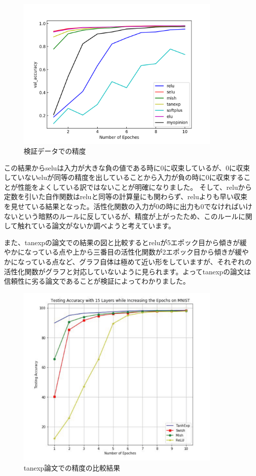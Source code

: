 \documentclass[12pt,a4j,draft]{jsarticle}
\begin{document}
\begin{figure}[H]
  \begin{center}
    \includegraphics[width=10.0cm]{../comparison_data/mnist_val_acc.png}
    \caption{検証データでの精度}
    \label{val_acc}
  \end{center}
\end{figure}

この結果からseluは入力が大きな負の値である時に0に収束しているが、0に収束していないeluが同等の精度を出していることから入力が負の時に0に収束することが性能をよくしている訳ではないことが明確になりました。
そして、reluから定数を引いた自作関数はreluと同等の計算量にも関わらず、reluよりも早い収束を見せている結果となった。活性化関数の入力が0の時に出力も0でなければいけないという暗黙のルールに反しているが、精度が上がったため、このルールに関して触れている論文がないか調べようと考えています。

また、tanexpの論文での結果の図と比較するとreluが5エポック目から傾きが緩やかになっている点や上から三番目の活性化関数が2エポック目から傾きが緩やかになっている点など、グラフ自体は極めて近い形をしていますが、それぞれの活性化関数がグラフと対応していないように見られます。よってtanexpの論文は信頼性に劣る論文であることが検証によってわかりました。

\begin{figure}[H]
  \begin{center}
    \includegraphics[width=10.0cm]{../image/tanexp_acc.png}
    \caption{tanexp論文での精度の比較結果}
    \label{tanexp_acc}
  \end{center}
\end{figure}
\end{document}
